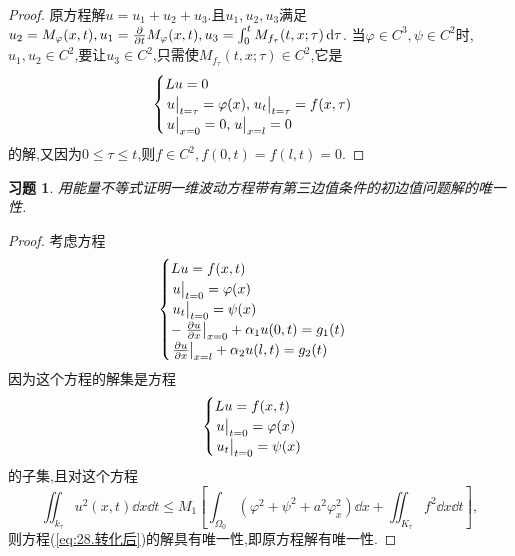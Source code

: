 \documentclass[a4paper,oneside,12pt]{ctexart}
\theoremstyle{plain}
\newtheorem{exercise}{习题}
\theoremstyle{nonumberplain}
\theoremstyle{nonumberplain}
\newtheorem{proof}{证明.}
\renewcommand{\phi}{\varphi}
\begin{document}
\begin{proof}
        原方程解$u=u_1+u_2+u_3$.且$u_1,u_2,u_3$满足$u_2=M_\phi(x,t),u_1=\pdv{t}M_\phi(x,t),u_3=\int_0^tM_{f_\tau}(t,x;\tau)\dd{\tau}$.
        当$\phi\in C^3,\psi\in C^2$时,$u_1,u_2\in C^2$,要让$u_3\in C^2$,只需使$M_{f_\tau}(t,x;\tau)\in C^2$,它是 
        \begin{equation*}
            \begin{cases}
                Lu=0\\
            \eval{u}_{t=\tau}=\phi(x),\eval{u_t}_{t=\tau}=f(x,\tau)\\
            \eval{u}_{x=0}=0,\eval{u}_{x=l}=0
            \end{cases}
        \end{equation*}
        的解,又因为$0\leqslant \tau\leqslant t$,则$f\in C^2,f(0,t)=f(l,t)=0$.
    \end{proof}
    
    \begin{exercise}
        \label{ex:28}
        用能量不等式证明一维波动方程带有第三边值条件的初边值问题解的唯一性.
    \end{exercise}

    \begin{proof}
        考虑方程 
        \begin{equation*}
            \begin{cases}
                Lu=f(x,t)\\
                \eval{u}_{t=0}=\phi(x)\\
                \eval{u_t}_{t=0}=\psi(x)\\
                -\eval{\pdv{u}{x}}_{x=0}+\alpha_1 u(0,t)=g_1(t)\\
                \eval{\pdv{u}{x}}_{x=l}+\alpha_2 u(l,t)=g_2(t)
            \end{cases}
        \end{equation*}
        因为这个方程的解集是方程
        \begin{equation}
            \label{eq:28.转化后}
            \begin{cases}
                Lu=f(x,t)\\
                \eval{u}_{t=0}=\phi(x)\\
                \eval{u_t}_{t=0}=\psi(x)\\
            \end{cases}
        \end{equation}
        的子集,且对这个方程
        \begin{equation*}
            \iint_{k_\tau}u^2(x,t)\dd{x}\dd{t}\leqslant M_1\left[\int_{\Omega_0}(\phi^2+\psi^2+a^2\phi_x^2)\dd{x}+\iint_{K_\tau}f^2\dd{x}\dd{t}\right],
        \end{equation*}
        则方程(\ref{eq:28.转化后})的解具有唯一性,即原方程解有唯一性.
    \end{proof}
\end{document}
